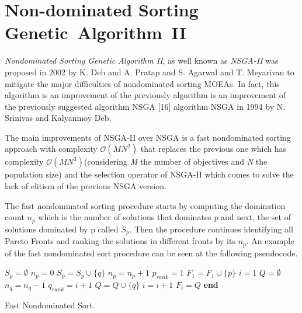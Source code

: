 \section{Non-dominated Sorting Genetic~Algorithm~II}
\textit{Nondominated Sorting Genetic Algorithm II}, as well known as \textit{NSGA-II} was proposed in 2002 by K. Deb and A. Pratap and S. Agarwal and T. Meyarivan to mitigate the major difficulties of nondominated sorting MOEAs\cite{996017}. In fact, this algorithm is an improvement of the previously algorithm is an improvement of the previously suggested algorithm NSGA [16] algorithm NSGA\cite{Srinivas1994MuiltiobjectiveOU} in 1994 by N. Srinivas and Kalyanmoy Deb.

The main improvements of NSGA-II over NSGA is a fast nondominated sorting approach with complexity $\mathcal{O}(MN^{2})$ that replaces the previous one which has complexity $\mathcal{O}(MN^{3})$\cite{996017}(considering \textit{M} the number of objectives and \textit{N} the population size) and the selection operator of NSGA-II which comes to solve the lack of elitism of the previous NSGA version. 

The fast nondominated sorting procedure starts by computing the domination count $n_{p}$ which is the number of solutions that dominates \textit{p} and next, the set of solutions dominated by p called \textit{$S_{p}$}. Then the procedure continues identifying all Pareto Fronts and ranking the solutions in different fronts by its $n_{p}$\cite{996017}. An example of the fast nondominated sort procedure can be seen at the following pseudocode.

\begin{algorithm}[H]
\begin{algorithmic}[1]
    \State $S_{p} = \emptyset$
    \State $n_{p} = 0$
            \State $S_{p} = S_{p} \cup \{q\}$
        \Else {}
                \State $n_{p} = n_{p} + 1$
            \EndIf
        \EndIf
    \EndFor
        \State $p_{rank} = 1$
        \State $F_{1} = F_{1} \cup \{p\}$
    \EndIf
\EndFor
\State $i = 1$
    \State $Q = \emptyset$
            \State $n_{q} = n_{q} - 1$
                \State $q_{rank} = i + 1$
                \State $Q = Q \cup \{q\}$
            \EndIf
        \EndFor
    \EndFor
    \State $i = i + 1$
    \State $F_{i} = Q$
\EndWhile
\State \textbf{end}
\end{algorithmic}
\caption{Fast Nondominated Sort.}
\end{algorithm}

